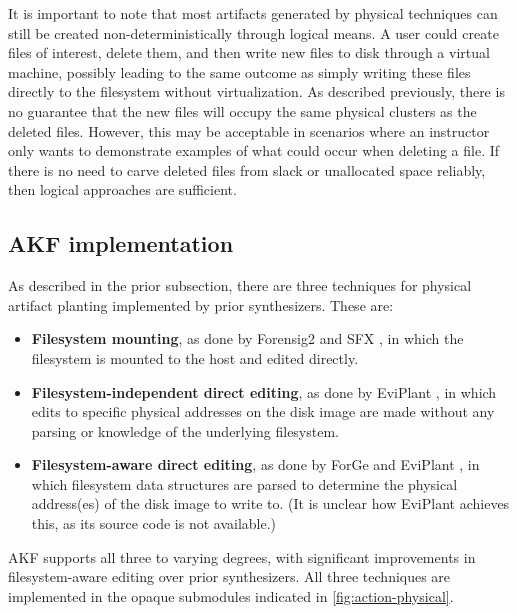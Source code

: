 \documentclass[letterpaper,12pt]{report}
\def\tightlist{}
\begin{document}
It is important to note that most artifacts generated by physical
techniques can still be created non-deterministically through logical
means. A user could create files of interest, delete them, and then
write new files to disk through a virtual machine, possibly leading to
the same outcome as simply writing these files directly to the
filesystem without virtualization. As described previously, there is no
guarantee that the new files will occupy the same physical clusters as
the deleted files. However, this may be acceptable in scenarios where an
instructor only wants to demonstrate examples of what could occur when
deleting a file. If there is no need to carve deleted files from slack
or unallocated space reliably, then logical approaches are sufficient.

\subsection{AKF implementation}\label{akf-implementation}

As described in the prior subsection, there are three techniques for
physical artifact planting implemented by prior synthesizers. These are:

\begin{itemize}
\tightlist
\item
  \textbf{Filesystem mounting}, as done by Forensig2
  \cite{mochForensicImageGenerator2009} and SFX
  \cite{russellForensicImageDescription2012}, in which the
  filesystem is mounted to the host and edited directly.
\item
  \textbf{Filesystem-independent direct editing}, as done by EviPlant
  \cite{scanlonEviPlantEfficientDigital2017}, in which edits to
  specific physical addresses on the disk image are made without any
  parsing or knowledge of the underlying filesystem.
\item
  \textbf{Filesystem-aware direct editing}, as done by ForGe
  \cite{vistiAutomaticCreationComputer2015} and EviPlant
  \cite{scanlonEviPlantEfficientDigital2017}, in which filesystem
  data structures are parsed to determine the physical address(es) of
  the disk image to write to. (It is unclear how EviPlant achieves this,
  as its source code is not available.)
\end{itemize}

AKF supports all three to varying degrees, with significant improvements
in filesystem-aware editing over prior synthesizers. All three
techniques are implemented in the opaque submodules indicated in
\autoref{fig:action-physical}.
\end{document}
